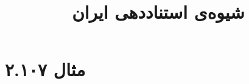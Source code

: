 \documentclass[a4paper,10pt]{article}
\begin{document}
\title{شیوه‌ی استناددهی ایران}
\author{}
\date{}
\maketitle



\section*{مثال ۲.۱۰۷}

\cite{امانی1347}\\
\cite{گیلیپسی1970}\\
\cite{وست1992}\\
\\
\\
\\






\end{document}
